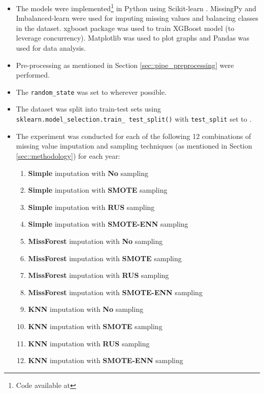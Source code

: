 \documentclass[11pt,a4paper]{article}
\begin{document}
\begin{itemize}
    \item The models were implemented\footnote{Code available at \vargithubrepo} in Python using Scikit-learn \cite{scikit-learn}. MissingPy and Imbalanced-learn \cite{imb-learn} were used for imputing missing values and balancing classes in the dataset. xgboost package \cite{xgboost} was used to train XGBoost model (to leverage concurrency).  Matplotlib \cite{matplotlib} was used to plot graphs and Pandas \cite{pandas1,pandas2} was used for data analysis.
    
    \item Pre-processing as mentioned in Section \ref{sec::pipe_preprocessing} were performed.
    
    \item The \texttt{random\_state} was set to \varrandomstate wherever possible.
    
    \item The dataset was split into train-test sets using \texttt{ sklearn.model\_selection.train\_ test\_split()} with \texttt{test\_split} set to \varsplit.
    
    \item The experiment was conducted for each of the following 12 combinations of missing value imputation and sampling techniques (as mentioned in Section \ref{sec::methodology}) for each year:
        \begin{enumerate}
            \item \textbf{Simple} imputation with \textbf{No} sampling
        \item \textbf{Simple} imputation with \textbf{SMOTE} sampling
        \item \textbf{Simple} imputation with \textbf{RUS} sampling
        \item \textbf{Simple} imputation with \textbf{SMOTE-ENN} sampling
        \item \textbf{MissForest} imputation with \textbf{No} sampling
        \item \textbf{MissForest} imputation with \textbf{SMOTE} sampling
        \item \textbf{MissForest} imputation with \textbf{RUS} sampling
        \item \textbf{MissForest} imputation with \textbf{SMOTE-ENN} sampling
        \item \textbf{KNN} imputation with \textbf{No} sampling
        \item \textbf{KNN} imputation with \textbf{SMOTE} sampling
        \item \textbf{KNN} imputation with \textbf{RUS} sampling
        \item \textbf{KNN} imputation with \textbf{SMOTE-ENN} sampling
        \end{enumerate}
        

\end{itemize}
\end{document}
